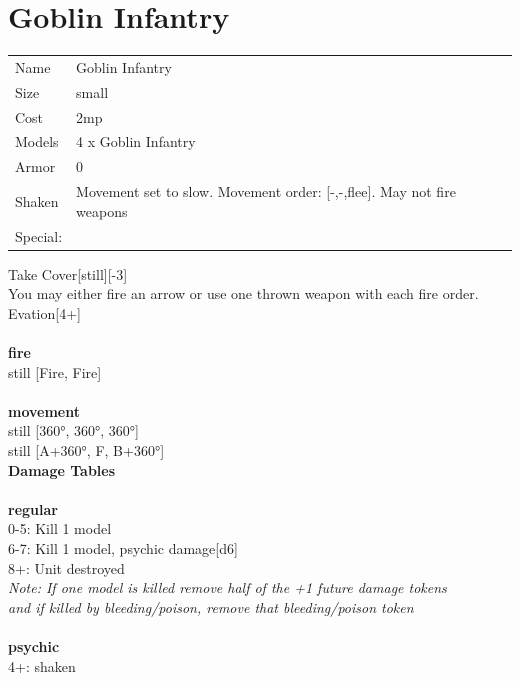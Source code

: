 \clearpage

\section{ Goblin Infantry }

\begin{tabular}{ll}
  Name & Goblin Infantry \\
  Size & small\\
  Cost & 2mp\\
  Models & 4 x Goblin Infantry\\
  Armor & 0\\
  Shaken & Movement set to slow. Movement order: [-,-,flee]. May not fire weapons\\
  Special: \\
\end{tabular}

\noindent Take Cover[still][-3]\\ 
You may either fire an arrow or use one thrown weapon with each fire order.\\ 
Evation[4+]\\ 


\ \\ {\bf fire } \\
still [Fire, Fire] \\
\ \\ {\bf movement } \\
still [360°, 360°, 360°] \\
still [A+360°, F, B+360°] \\


{\bf Damage Tables} \\
\ \\ {\bf regular } \\
0-5: Kill 1 model \\
6-7: Kill 1 model, psychic damage[d6] \\
8+: Unit destroyed \\
{{\it Note: If one model is killed remove half of the +1 future damage tokens \\ and if killed by bleeding/poison, remove that bleeding/poison token}} \\
\ \\ {\bf psychic } \\
4+: shaken \\


